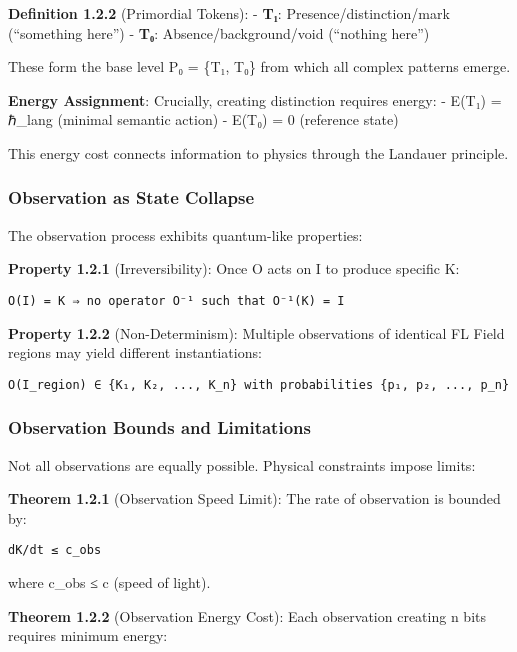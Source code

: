 \textbf{Definition 1.2.2} (Primordial Tokens): - \textbf{T₁}:
Presence/distinction/mark (``something here'') - \textbf{T₀}:
Absence/background/void (``nothing here'')

These form the base level P₀ = \{T₁, T₀\} from which all complex
patterns emerge.

\textbf{Energy Assignment}: Crucially, creating distinction requires
energy: - E(T₁) = ℏ\_lang (minimal semantic action) - E(T₀) = 0
(reference state)

This energy cost connects information to physics through the Landauer
principle.

\subsubsection{Observation as State
Collapse}\label{observation-as-state-collapse}

The observation process exhibits quantum-like properties:

\textbf{Property 1.2.1} (Irreversibility): Once O acts on I to produce
specific K:

\begin{verbatim}
O(I) = K ⇒ no operator O⁻¹ such that O⁻¹(K) = I
\end{verbatim}

\textbf{Property 1.2.2} (Non-Determinism): Multiple observations of
identical FL Field regions may yield different instantiations:

\begin{verbatim}
O(I_region) ∈ {K₁, K₂, ..., K_n} with probabilities {p₁, p₂, ..., p_n}
\end{verbatim}

\subsubsection{Observation Bounds and
Limitations}\label{observation-bounds-and-limitations}

Not all observations are equally possible. Physical constraints impose
limits:

\textbf{Theorem 1.2.1} (Observation Speed Limit): The rate of
observation is bounded by:

\begin{verbatim}
dK/dt ≤ c_obs
\end{verbatim}

where c\_obs ≤ c (speed of light).

\textbf{Theorem 1.2.2} (Observation Energy Cost): Each observation
creating n bits requires minimum energy:

